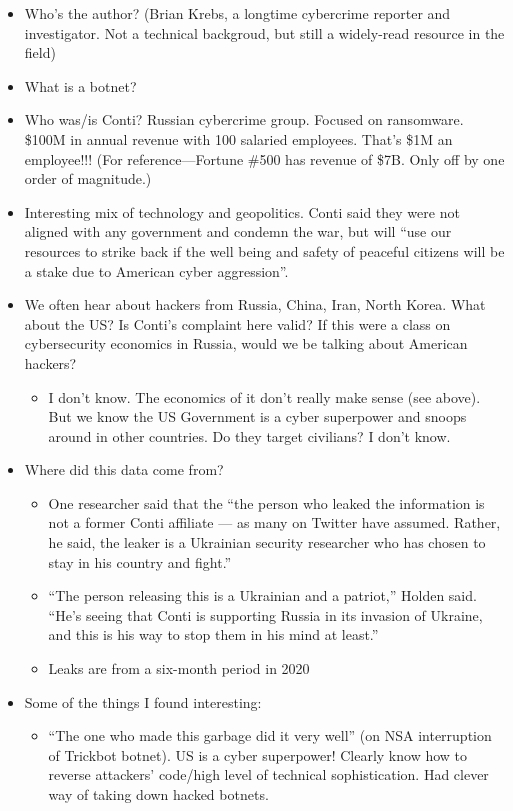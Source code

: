 \documentclass[11pt]{article}
\begin{document}
\begin{itemize}
    \item Who's the author? (Brian Krebs, a longtime cybercrime reporter and investigator. Not a technical backgroud, but still a widely-read resource in the field)
    \item What is a botnet?
    \item Who was/is Conti? Russian cybercrime group. Focused on ransomware. \$100M in annual revenue with 100 salaried employees. That's \$1M an employee!!! (For reference---Fortune \#500 has revenue of \$7B. Only off by one order of magnitude.)
    \item Interesting mix of technology and geopolitics. Conti said they were not aligned with any government and condemn the war, but will ``use our resources to strike back if the well being and safety of peaceful citizens will be a stake due to American cyber aggression''.
    \item We often hear about hackers from Russia, China, Iran, North Korea. What about the US? Is Conti's complaint here valid? If this were a class on cybersecurity economics in Russia, would we be talking about American hackers?
    \begin{itemize}
        \item I don't know. The economics of it don't really make sense (see above). But we know the US Government is a cyber superpower and snoops around in other countries. Do they target civilians? I don't know.
    \end{itemize}
    \item Where did this data come from?
    \begin{itemize}
        \item One researcher said that the ``the person who leaked the information is not a former Conti affiliate — as many on Twitter have assumed. Rather, he said, the leaker is a Ukrainian security researcher who has chosen to stay in his country and fight.''
        \item ``The person releasing this is a Ukrainian and a patriot,” Holden said. “He’s seeing that Conti is supporting Russia in its invasion of Ukraine, and this is his way to stop them in his mind at least.''
        \item Leaks are from a six-month period in 2020
    \end{itemize}
    \item Some of the things I found interesting:
    \begin{itemize}
        \item ``The one who made this garbage did it very well'' (on NSA interruption of Trickbot botnet). US is a cyber superpower! Clearly know how to reverse attackers' code/high level of technical sophistication. Had clever way of taking down hacked botnets. 

\end{itemize}
\end{itemize}
\end{document}
